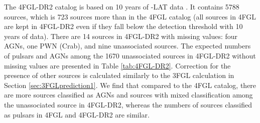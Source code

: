 The 4FGL-DR2 catalog \citep{2020arXiv200511208B} 
is based on 10 years of \Fermi-LAT data \citep[compared to 8 years of data in the 4FGL catalog,][]{2020ApJS..247...33A}.
It contains 5788 sources, which is 723 sources more than in the 4FGL catalog (all sources in 4FGL are kept in 4FGL-DR2 even if they fall
below the detection threshold with 10 years of data).
There are 14 sources in 4FGL-DR2 with missing values: four AGNs, one PWN (Crab), and nine unassociated sources.
The expected numbers of pulsars and AGNs among the 1670 unassociated sources in 4FGL-DR2 without missing values are
presented in Table \ref{tab:4FGL-DR2}.
Correction for the presence of other sources is calculated similarly to the 3FGL calculation in Section \ref{sec:3FGLprediction1}.
We find that compared to the 4FGL catalog, there are more sources classified as AGNs and sources with mixed classification among the unassociated source in 4FGL-DR2, whereas the numbers of sources classified as pulsars in 4FGL and 4FGL-DR2 are similar.

\begin{table}[!h]
    \vspace{0.2cm}
    \caption{Expected numbers of pulsars and AGNs among unassociated sources in the 4FGL-DR2 catalog \citep{2020arXiv200511208B}.
    For definitions see Table \ref{tab:3FGL_prediction}.}
    \label{tab:4FGL-DR2}
\end{table}
